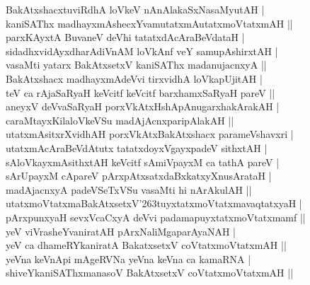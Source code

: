 \begin{entry}
\begin{shl}
BakAtxshacxtuviRdhA loVkeV nAnAlakaSxNasaMyutAH |\\
kaniSAThx madhayxmAshecxYvamutatxmAutatxmoVtatxmAH ||\\
parxKAyxtA BuvaneV deVhi tatatxdAcAraBeVdataH |\\
sidadhxvidAyxdharAdiVnAM loVkAnf veY samupAshirxtAH |\\
vasaMti yatarx BakAtxsetxV kaniSAThx madanujacnxyA ||\\
BakAtxshacx madhayxmAdeVvi tirxvidhA loVkapUjitAH |\\
teV ca rAjaSaRyaH keVcitf keVcitf barxhamxSaRyaH pareV ||\\
aneyxV deVvaSaRyaH porxVkAtxHshApAnugarxhakArakAH |\\
caraMtayxKilaloVkeVSu madAjAcnxparipAlakAH ||\\
utatxmAsitxrXvidhAH porxVkAtxBakAtxshacx parameVshavxri |\\
utatxmAcAraBeVdAtutx tatatxdoyxVgayxpadeV sithxtAH |\\
sAloVkayxmAsithxtAH keVcitf sAmiVpayxM ca tathA pareV |\\
sArUpayxM cApareV pArxpAtxsatxdaBxkatxyXnusArataH |\\
madAjacnxyA padeVSeTxVSu vasaMti hi nArAkulAH ||\\
utatxmoVtatxmaBakAtxsetxV{\char'263}tuyxtatxmoVtatxmavaqtatxyaH |\\
pArxpunxyaH sevxVcaCxyA deVvi padamapuyxtatxmoVtatxmamf ||\\
yeV viVrasheYvaniratAH pArxNaliMgaparAyaNAH |\\
yeV ca dhameRYkaniratA BakatxsetxV coVtatxmoVtatxmAH ||\\
yeVna keVnApi mAgeRVNa yeVna keVna ca kamaRNA |\\
shiveYkaniSAThxmanasoV BakAtxsetxV coVtatxmoVtatxmAH ||
\end{shl}
\end{entry}

